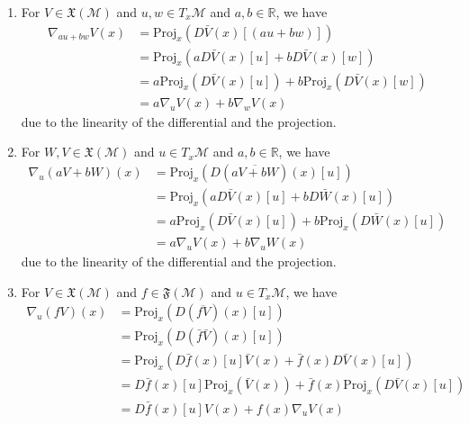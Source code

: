 \documentclass[en, oneside]{assignment}
\begin{document}
\begin{sol}
\begin{enumerate}[label=(\arabic*)]
        \item For $V \in \mathfrak{X} (\mathcal{M})$ and $u, w \in T _x \mathcal{M}$ and $a, b \in \mathbb{R}$, we have
        \begin{align*}
            \nabla _{a u + b w} V (x)&= \text{Proj} _x \left( D \bar{V} (x) [(a u + b w)] \right)\\
            &= \text{Proj} _x \left( a D \bar{V} (x) [u] + b D \bar{V} (x) [w] \right)\\
            &= a \text{Proj} _x \left( D \bar{V} (x) [u] \right) + b \text{Proj} _x \left( D \bar{V} (x) [w] \right)\\
            &= a \nabla _u V (x) + b \nabla _w V (x)
        \end{align*}
        due to the linearity of the differential and the projection.
        \item For $W, V \in \mathfrak{X} (\mathcal{M})$ and $u \in T _x \mathcal{M}$ and $a, b \in \mathbb{R}$, we have
        \begin{align*}
            \nabla _u (a V + b W) (x)&= \text{Proj} _x \left( D (\overline{a V + b W}) (x) [u] \right)\\
            &= \text{Proj} _x \left( a D \bar{V} (x) [u] + b D \bar{W} (x) [u] \right)\\
            &= a \text{Proj} _x \left( D \bar{V} (x) [u] \right) + b \text{Proj} _x \left( D \bar{W} (x) [u] \right)\\
            &= a \nabla _u V (x) + b \nabla _u W (x)
        \end{align*}
        due to the linearity of the differential and the projection.
        \item For $V \in \mathfrak{X} (\mathcal{M})$ and $f \in \mathfrak{F} (\mathcal{M})$ and $u \in T _x \mathcal{M}$, we have
        \begin{align*}
            \nabla _u (f V) (x)&= \text{Proj} _x \left( D (\overline{f V}) (x) [u] \right)\\
            &= \text{Proj} _x \left( D (\bar{f} \bar{V}) (x) [u] \right)\\
            &= \text{Proj} _x \left( D \bar{f} (x) [u] \bar{V} (x) + \bar{f} (x) D \bar{V} (x) [u] \right)\\
            &= D \bar{f} (x) [u] \text{Proj} _x \left( \bar{V} (x) \right) + \bar{f} (x) \text{Proj} _x \left( D \bar{V} (x) [u] \right)\\
            &= D \bar{f} (x) [u] V (x) + f(x) \nabla _u V (x)
        \end{align*}

\end{enumerate}
\end{sol}
\end{document}
